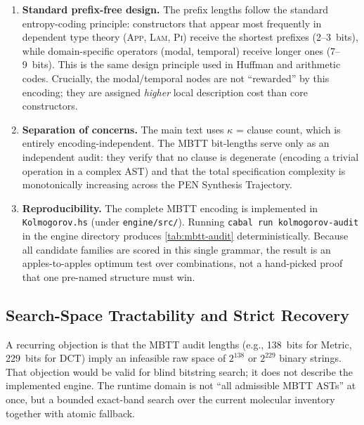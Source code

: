 \documentclass[11pt,a4paper]{article}
\theoremstyle{plain}
\theoremstyle{definition}
\theoremstyle{remark}
\begin{document}
\begin{enumerate}[nosep]
\item \textbf{Standard prefix-free design.}
The prefix lengths follow the standard entropy-coding principle: constructors that appear most frequently in dependent type theory (\textsc{App}, \textsc{Lam}, \textsc{Pi}) receive the shortest prefixes (2--3~bits), while domain-specific operators (modal, temporal) receive longer ones (7--9~bits).
This is the same design principle used in Huffman and arithmetic codes.
Crucially, the modal/temporal nodes are not ``rewarded'' by this encoding; they are assigned \emph{higher} local description cost than core constructors.

\item \textbf{Separation of concerns.}
The main text uses $\kappa$ = clause count, which is entirely encoding-independent.
The MBTT bit-lengths serve only as an independent audit: they verify that no clause is degenerate (encoding a trivial operation in a complex AST) and that the total specification complexity is monotonically increasing across the PEN Synthesis Trajectory.

\item \textbf{Reproducibility.}
The complete MBTT encoding is implemented in \texttt{Kolmogorov.hs} (under \texttt{engine/src/}).
Running \texttt{cabal run kolmogorov-audit} in the engine directory produces \cref{tab:mbtt-audit} deterministically.
Because all candidate families are scored in this single grammar, the result is an apples-to-apples optimum test over combinations, not a hand-picked proof that one pre-named structure must win.
\end{enumerate}

\subsection{Search-Space Tractability and Strict Recovery}
\label{sec:search-tractability}

A recurring objection is that the MBTT audit lengths (e.g., 138~bits for Metric, 229~bits for DCT) imply an infeasible raw space of $2^{138}$ or $2^{229}$ binary strings.
That objection would be valid for blind bitstring search; it does not describe the implemented engine.
The runtime domain is not ``all admissible MBTT ASTs'' at once, but a bounded exact-band search over the current molecular inventory together with atomic fallback.
\end{document}
